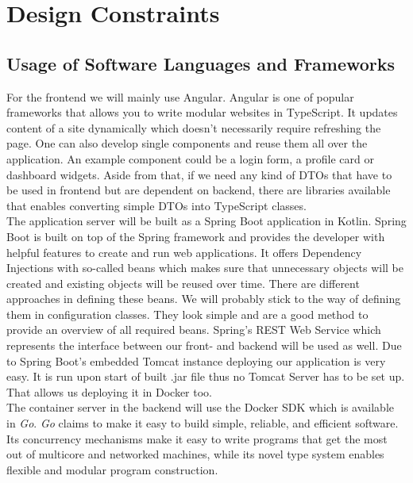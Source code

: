 \documentclass[a4paper,12pt,chapterprefix=false,bibliography=totoc,listof=totoc,]{scrreprt}
\newcommand{\gls}[1]{\uppercase{#1}}
\begin{document}
\section{Design Constraints}

\subsection{Usage of Software Languages and Frameworks}
For the frontend we will mainly use Angular. Angular is one of popular frameworks that allows you to write modular websites in TypeScript. It updates content of a site dynamically which doesn't necessarily require refreshing the page. One can also develop single components and reuse them all over the application. An example component could be a login form, a profile card or dashboard widgets. Aside from that, if we need any kind of \gls{dto}s that have to be used in frontend but are dependent on backend, there are libraries available that enables converting simple \gls{dto}s into TypeScript classes. \\

The application server will be built as a Spring Boot application in Kotlin. Spring Boot is built on top of the Spring framework and provides the developer with helpful features to create and run web applications. It offers Dependency Injections with so-called beans which makes sure that unnecessary objects will be created and existing objects will be reused over time. There are different approaches in defining these beans. We will probably stick to the way of defining them in configuration classes. They look simple and are a good method to provide an overview of all required beans. Spring's REST Web Service which represents the interface between our front- and backend will be used as well. Due to Spring Boot's embedded Tomcat instance deploying our application is very easy. It is run upon start of built .jar file thus no Tomcat Server has to be set up. That allows us deploying it in Docker too. \\

The container server in the backend will use the Docker SDK which is available in \emph{Go}. \emph{Go} claims to make it easy to build simple, reliable, and efficient software. Its concurrency mechanisms make it easy to write programs that get the most out of multicore and networked machines, while its novel type system enables flexible and modular program construction.
\end{document}
